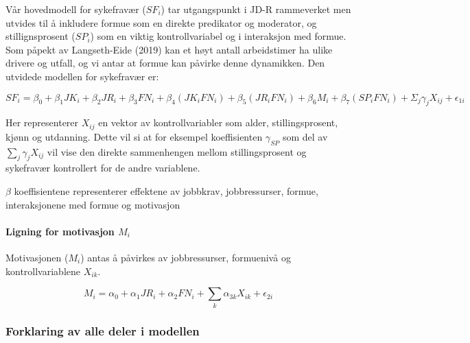 \documentclass[
  12pt,
  a4paper,
  DIV=11,
  numbers=noendperiod]{scrartcl}
\let\oldparagraph\paragraph
\renewcommand{\paragraph}[1]{\oldparagraph{#1}\mbox{}}
\begin{document}
Vår hovedmodell for sykefravær (\(SF_i\)) tar utgangspunkt i JD-R
rammeverket men utvides til å inkludere formue som en direkte predikator
og moderator, og stillignsprosent (\(SP_i\)) som en viktig
kontrollvariabel og i interaksjon med formue. Som påpekt av
Langseth-Eide (2019) kan et høyt antall arbeidstimer ha ulike drivere og
utfall, og vi antar at formue kan påvirke denne dynamikken. Den utvidede
modellen for sykefravær er:

\[
SF_i = \beta_0 + \beta_1 JK_i + \beta_2 JR_i + \beta_3 FN_i + \beta_4 (JK_i FN_i) + \beta_5 (JR_i FN_i) + \beta_6 M_i + \beta_7 (SP_i FN_i) + \Sigma_j \gamma_{j}X_{ij} + \epsilon_{1i} \label{eq:sf_utvidet}
\]

Her representerer \(X_{ij}\) en vektor av kontrollvariabler som alder,
stillingsprosent, kjønn og utdanning. Dette vil si at for eksempel
koeffisienten \(\gamma_{SP}\) som del av \(\sum_j \gamma_{j}X_{ij}\) vil
vise den direkte sammenhengen mellom stillingsprosent og sykefravær
kontrollert for de andre variablene.

\(\beta\) koeffisientene representerer effektene av jobbkrav,
jobbressurser, formue, interaksjonene med formue og motivasjon

\paragraph{\texorpdfstring{Ligning for motivasjon
\(M_i\)}{Ligning for motivasjon M\_i}}\label{ligning-for-motivasjon-m_i}

Motivasjonen (\(M_i\)) antas å påvirkes av jobbressurser, formuenivå og
kontrollvariablene \(X_{ik}\).

\[
M_i = \alpha_0 + \alpha_1 JR_i + \alpha_2 FN_i + \sum_k \alpha_{3k}X_{ik} + \epsilon_{2i} \tag{Motivasjon}\label{eq:motivasjon}
\]

\subsubsection{Forklaring av alle deler i
modellen}\label{forklaring-av-alle-deler-i-modellen}
\end{document}
